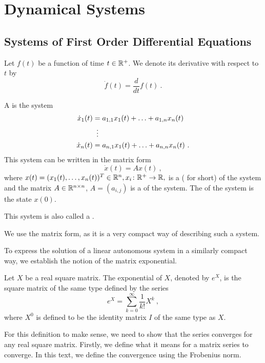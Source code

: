 \chapter{Dynamical Systems}
\label{chap:intr}

\section{Systems of First Order Differential Equations}

\begin{remark}
	Let $f(t)$ be a function of time $t\in\mathbb{R}^+$. We denote its derivative with respect to $t$ by $$\dot{f}(t)=\frac{d}{dt}f(t)\ .$$
\end{remark}

\begin{definition}
	A  is the system 
	\begin{align*}
		\dot{x}_1(t)&=a_{1,1}x_1(t)+\ldots+a_{1,n}x_n(t) \\
		&\vdotswithin{=} \\
		\dot{x}_n(t)&=a_{n,1}x_1(t)+\ldots+a_{n,n}x_n(t)\ .
	\end{align*}
	This system can be written in the matrix form $$\dot{x}(t)=Ax(t)\ ,$$ where $x(t)=(x_1(t),\ldots,x_n(t))^T \in \mathbb{R}^n, x_i\colon\mathbb{R}^+\to\mathbb{R},$ is a  ( for short) of the system and the matrix $A\in \mathbb{R}^{n\times n}$, $A=(a_{i,j})$ is a  of the system. The  of the system is the state $x(0)$.

	This system is also called a .
\end{definition}

We use the matrix form, as it is a very compact way of describing such a system.

To express the solution of a linear autonomous system in a similarly compact way, we establish the notion of the matrix exponential.

\begin{definition}
	Let $X$ be a real square matrix. The exponential of $X$, denoted by $e^X$, is the square matrix of the same type defined by the series $$e^{X}=\sum _{k=0}^{\infty}\frac{1}{k!}X^{k}\ ,$$
	where $X^0$ is defined to be the identity matrix $I$ of the same type as $X$.
\end{definition}

For this definition to make sense, we need to show that the series converges for any real square matrix. Firstly, we define what it means for a matrix series to converge. In this text, we define the convergence using the Frobenius norm.

